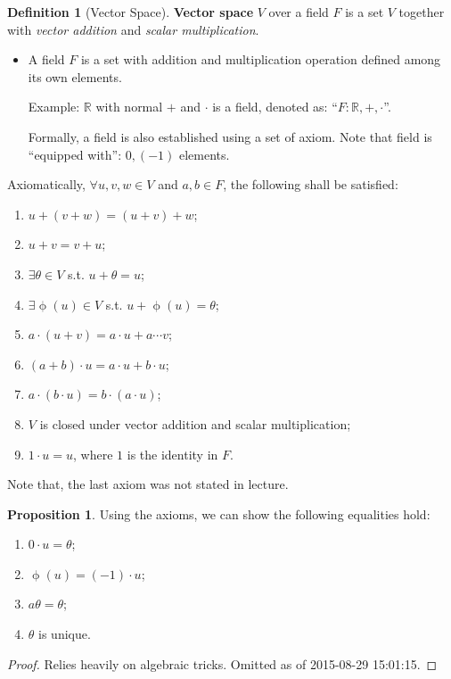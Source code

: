\documentclass[12pt]{article}
\newcommand{\R}{{\mathbb R}}
\theoremstyle{definition}
\newtheorem{definition}[theorem]{Definition}
\newtheorem{proposition}[theorem]{Proposition}
\theoremstyle{plain}
\begin{document}
\begin{definition}
    [Vector Space]
    \textbf{Vector space} $V$ over a field $F$ is a set $V$ together with 
    \textit{vector addition} and \textit{scalar multiplication}.
    \begin{itemize}
        \item A field $F$ is a set with addition and multiplication operation 
            defined among its own elements.

            Example: $\R$ with normal $+$ and $\cdot$ is a field, denoted as: 
            ``$F:\R, +, \cdot$''.

            Formally, a field is also established using a set of axiom. Note 
            that field is ``equipped with'': $0, (-1)$ elements.
    \end{itemize}

    Axiomatically, $\forall u,v,w \in V$ and $a,b \in F$, the following shall be 
    satisfied: 
    \begin{enumerate}
        \item $u + (v+w) = (u+v) + w$;
        \item $u + v = v  + u$;
        \item $\exists \theta \in V$ s.t. $u + \theta = u$;
        \item $\exists \upphi (u) \in V$ s.t. $u + \upphi(u) = \theta$;
        \item $a\cdot(u+v) = a\cdot u + a\cdots v$;
        \item $(a+b) \cdot u = a\cdot u + b \cdot u$;
        \item $a\cdot (b \cdot u) = b \cdot (a \cdot u)$;
        \item $V$ is closed under vector addition and scalar multiplication;
        \item $1 \cdot u  = u$, where $1$ is the identity in $F$.
    \end{enumerate}

    Note that, the last axiom was not stated in lecture.
\end{definition}

\begin{proposition}
    Using the axioms, we can show the following equalities hold: 
    \begin{enumerate}
        \item $0 \cdot u = \theta$; 
        \item $\upphi (u) = (-1) \cdot u$;
        \item $a\theta  = \theta$;
        \item $\theta$ is unique.
    \end{enumerate}
    \begin{proof}
        Relies heavily on algebraic tricks. Omitted as of  2015-08-29 15:01:15.
    \end{proof}
\end{proposition}
\end{document}
